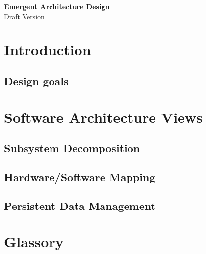 \documentclass{article}
\begin{document}
\begin{minipage}[H]{\textwidth}
\vspace{0.3cm}
		\begin{center}
		  \vspace{0.3cm}
		  \Huge{\textbf{Emergent Architecture Design}}\\
		  \huge{Draft Version}
	      \vspace{0.3cm}	
   		  \vspace{0.7cm}	
		\end{center}
	\end{minipage}
\tableofcontents
\newpage
	\section{Introduction}
	
	 \subsection{Design goals}
	 
	 \section{Software Architecture Views}
	 \subsection{Subsystem Decomposition} 
	 
	 \subsection{Hardware/Software Mapping} 
	 
	 \subsection{Persistent Data Management} 
	 
\newpage
	\section{Glassory}
\end{document}
